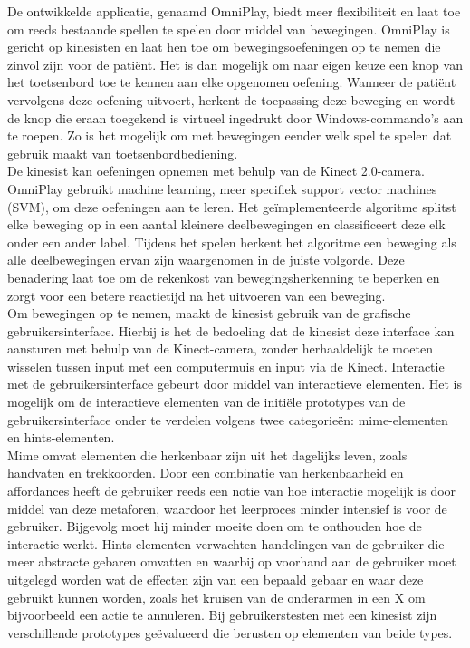 De ontwikkelde applicatie, genaamd OmniPlay, biedt meer flexibiliteit en laat toe om reeds bestaande spellen te spelen door middel van bewegingen. OmniPlay is gericht op kinesisten en laat hen toe om bewegingsoefeningen op te nemen die zinvol zijn voor de pati\"ent. Het is dan mogelijk om naar eigen keuze een knop van het toetsenbord toe te kennen aan elke opgenomen oefening. Wanneer de pati\"ent vervolgens deze oefening uitvoert, herkent de toepassing deze beweging en wordt de knop die eraan toegekend is virtueel ingedrukt door Windows-commando's aan te roepen. Zo is het mogelijk om met bewegingen eender welk spel te spelen dat gebruik maakt van toetsenbordbediening.\\

De kinesist kan oefeningen opnemen met behulp van de Kinect 2.0-camera. OmniPlay gebruikt machine learning, meer specifiek support vector machines (SVM), om deze oefeningen aan te leren. Het ge\"implementeerde algoritme splitst elke beweging op in een aantal kleinere deelbewegingen en classificeert deze elk onder een ander label. Tijdens het spelen herkent het algoritme een beweging als alle deelbewegingen ervan zijn waargenomen in de juiste volgorde. Deze benadering laat toe om de rekenkost van bewegingsherkenning te beperken en zorgt voor een betere reactietijd na het uitvoeren van een beweging.\\

Om bewegingen op te nemen, maakt de kinesist gebruik van de grafische gebruikersinterface. Hierbij is het de bedoeling dat de kinesist deze interface kan aansturen met behulp van de Kinect-camera, zonder herhaaldelijk te moeten wisselen tussen input met een computermuis en input via de Kinect. Interactie met de gebruikersinterface gebeurt door middel van interactieve elementen. Het is mogelijk om de interactieve elementen van de initi\"ele prototypes van de gebruikersinterface onder te verdelen volgens twee categorie\"en: mime-elementen en hints-elementen.\\

Mime omvat elementen die herkenbaar zijn uit het dagelijks leven, zoals handvaten en trekkoorden. Door een combinatie van herkenbaarheid en affordances heeft de gebruiker reeds een notie van hoe interactie mogelijk is door middel van deze metaforen, waardoor het leerproces minder intensief is voor de gebruiker. Bijgevolg moet hij minder moeite doen om te onthouden hoe de interactie werkt. Hints-elementen verwachten handelingen van de gebruiker die meer abstracte gebaren omvatten en waarbij op voorhand aan de gebruiker moet uitgelegd worden wat de effecten zijn van een bepaald gebaar en waar deze gebruikt kunnen worden, zoals het kruisen van de onderarmen in een X om bijvoorbeeld een actie te annuleren. Bij gebruikerstesten met een kinesist zijn verschillende prototypes ge\"evalueerd die berusten op elementen van beide types.\\

